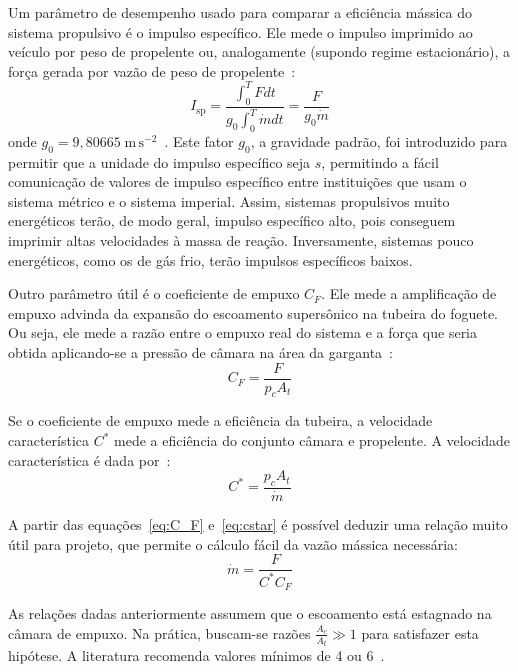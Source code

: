 Um parâmetro de desempenho usado para comparar a eficiência mássica do sistema propulsivo é o impulso específico. Ele mede o impulso imprimido ao veículo por peso de propelente ou, analogamente (supondo regime estacionário), a força gerada por vazão de peso de propelente~\cite{Sutton}:
\begin{equation}
    \label{eq:Isp}
    I_{\text{sp}} = \frac{\int^T_0 F dt}{g_0 \int^T_0 \dot{m}dt} = \frac{F}{g_0 \dot{m}}
\end{equation}
onde \(g_0=9,80665\;\mathrm{m}\,\mathrm{s}^{-2}\)~\cite{CGPM}. Este fator \(g_0\), a gravidade padrão, foi introduzido para permitir que a unidade do impulso específico seja \(s\), permitindo a fácil comunicação de valores de impulso específico entre instituições que usam o sistema métrico e o sistema imperial. Assim, sistemas propulsivos muito energéticos terão, de modo geral, impulso específico alto, pois conseguem imprimir altas velocidades à massa de reação. Inversamente, sistemas pouco energéticos, como os de gás frio, terão impulsos específicos baixos.

Outro parâmetro útil é o coeficiente de empuxo \(C_F\). Ele mede a amplificação de empuxo advinda da expansão do escoamento supersônico na tubeira do foguete. Ou seja, ele mede a razão entre o empuxo real do sistema e a força que seria obtida aplicando-se a pressão de câmara na área da garganta~\cite{Sutton}:
\begin{equation}
    \label{eq:C_F}
    C_F = \frac{F}{p_c A_t}
\end{equation}

Se o coeficiente de empuxo mede a eficiência da tubeira, a velocidade característica \(C^*\) mede a eficiência do conjunto câmara e propelente. A velocidade característica é dada por~\cite{Sutton}:
\begin{equation}
    \label{eq:cstar}
    C^* = \frac{p_c A_t}{\dot{m}}
\end{equation}

A partir das equações~\ref{eq:C_F} e~\ref{eq:cstar} é possível deduzir uma relação muito útil para projeto, que permite o cálculo fácil da vazão mássica necessária:
\begin{equation}
    \label{eq:mdot}
    \dot{m} = \frac{F}{C^* C_F}
\end{equation}

As relações dadas anteriormente assumem que o escoamento está estagnado na câmara de empuxo. Na prática, buscam-se razões \(\frac{A_c}{A_t} \gg 1\) para satisfazer esta hipótese. A literatura recomenda valores mínimos de 4 ou 6~\cite{Sutton}.

